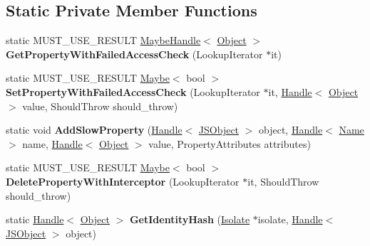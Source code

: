 \subsection*{Static Private Member Functions}
\begin{DoxyCompactItemize}
\item 
static M\+U\+S\+T\+\_\+\+U\+S\+E\+\_\+\+R\+E\+S\+U\+LT \hyperlink{classv8_1_1internal_1_1_maybe_handle}{Maybe\+Handle}$<$ \hyperlink{classv8_1_1internal_1_1_object}{Object} $>$ {\bfseries Get\+Property\+With\+Failed\+Access\+Check} (Lookup\+Iterator $\ast$it)\hypertarget{classv8_1_1internal_1_1_j_s_object_a9beb7f9535177f0b7757474b9fccf9cd}{}\label{classv8_1_1internal_1_1_j_s_object_a9beb7f9535177f0b7757474b9fccf9cd}

\item 
static M\+U\+S\+T\+\_\+\+U\+S\+E\+\_\+\+R\+E\+S\+U\+LT \hyperlink{classv8_1_1_maybe}{Maybe}$<$ bool $>$ {\bfseries Set\+Property\+With\+Failed\+Access\+Check} (Lookup\+Iterator $\ast$it, \hyperlink{classv8_1_1internal_1_1_handle}{Handle}$<$ \hyperlink{classv8_1_1internal_1_1_object}{Object} $>$ value, Should\+Throw should\+\_\+throw)\hypertarget{classv8_1_1internal_1_1_j_s_object_a4f0f38ed9b476b92a39d4ee7f4c18760}{}\label{classv8_1_1internal_1_1_j_s_object_a4f0f38ed9b476b92a39d4ee7f4c18760}

\item 
static void {\bfseries Add\+Slow\+Property} (\hyperlink{classv8_1_1internal_1_1_handle}{Handle}$<$ \hyperlink{classv8_1_1internal_1_1_j_s_object}{J\+S\+Object} $>$ object, \hyperlink{classv8_1_1internal_1_1_handle}{Handle}$<$ \hyperlink{classv8_1_1internal_1_1_name}{Name} $>$ name, \hyperlink{classv8_1_1internal_1_1_handle}{Handle}$<$ \hyperlink{classv8_1_1internal_1_1_object}{Object} $>$ value, Property\+Attributes attributes)\hypertarget{classv8_1_1internal_1_1_j_s_object_a54fe47fe31b616b2c112f2625e79d92c}{}\label{classv8_1_1internal_1_1_j_s_object_a54fe47fe31b616b2c112f2625e79d92c}

\item 
static M\+U\+S\+T\+\_\+\+U\+S\+E\+\_\+\+R\+E\+S\+U\+LT \hyperlink{classv8_1_1_maybe}{Maybe}$<$ bool $>$ {\bfseries Delete\+Property\+With\+Interceptor} (Lookup\+Iterator $\ast$it, Should\+Throw should\+\_\+throw)\hypertarget{classv8_1_1internal_1_1_j_s_object_ad757516fb9f238e704e34e6a81652f71}{}\label{classv8_1_1internal_1_1_j_s_object_ad757516fb9f238e704e34e6a81652f71}

\item 
static \hyperlink{classv8_1_1internal_1_1_handle}{Handle}$<$ \hyperlink{classv8_1_1internal_1_1_object}{Object} $>$ {\bfseries Get\+Identity\+Hash} (\hyperlink{classv8_1_1internal_1_1_isolate}{Isolate} $\ast$isolate, \hyperlink{classv8_1_1internal_1_1_handle}{Handle}$<$ \hyperlink{classv8_1_1internal_1_1_j_s_object}{J\+S\+Object} $>$ object)\hypertarget{classv8_1_1internal_1_1_j_s_object_ad50eed539c62c7d4b40c6250ea5f2df4}{}\label{classv8_1_1internal_1_1_j_s_object_ad50eed539c62c7d4b40c6250ea5f2df4}


\end{DoxyCompactItemize}
